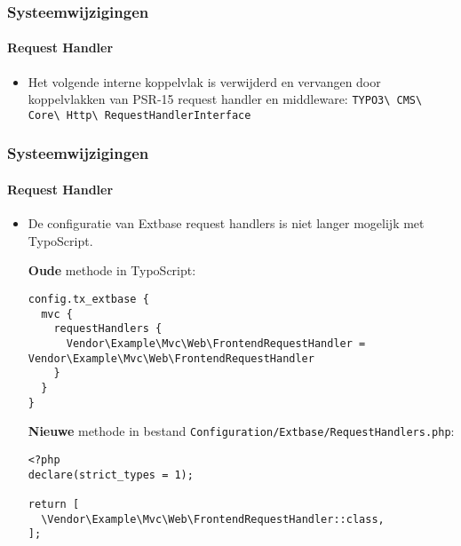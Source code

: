 
\begin{frame}[fragile]
	\frametitle{Systeemwijzigingen}
	\framesubtitle{Request Handler}

	\begin{itemize}
		\item Het volgende interne koppelvlak is verwijderd en vervangen door
			koppelvlakken van PSR-15 request handler en middleware:\newline
			\texttt{TYPO3\textbackslash
				CMS\textbackslash
				Core\textbackslash
				Http\textbackslash
				RequestHandlerInterface}

	\end{itemize}

\end{frame}


\begin{frame}[fragile]
	\frametitle{Systeemwijzigingen}
	\framesubtitle{Request Handler}

	\lstset{basicstyle=\tiny\ttfamily}

	\begin{itemize}
		\item De configuratie van Extbase request handlers is niet langer mogelijk met TypoScript.

		\smaller\textbf{Oude} methode in TypoScript:\normalsize
\begin{lstlisting}
config.tx_extbase {
  mvc {
    requestHandlers {
      Vendor\Example\Mvc\Web\FrontendRequestHandler = Vendor\Example\Mvc\Web\FrontendRequestHandler
    }
  }
}
\end{lstlisting}

		\smaller\textbf{Nieuwe} methode in bestand \texttt{Configuration/Extbase/RequestHandlers.php}:\normalsize
\begin{lstlisting}
<?php
declare(strict_types = 1);

return [
  \Vendor\Example\Mvc\Web\FrontendRequestHandler::class,
];
\end{lstlisting}

	\end{itemize}

\end{frame}

